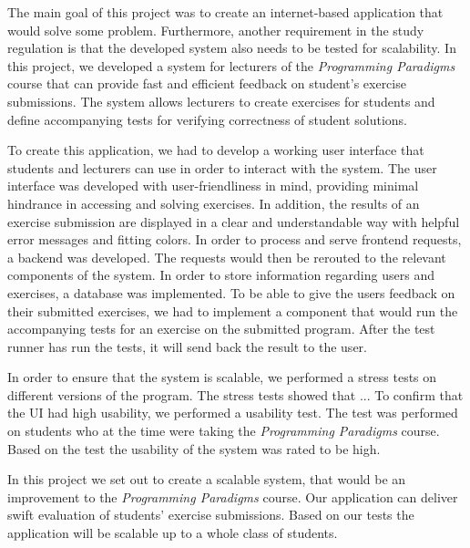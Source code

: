 The main goal of this project was to create an internet-based application that would solve some problem.
Furthermore, another requirement in the study regulation is that the developed system also needs to be tested for scalability. 
In this project, we developed a system for lecturers of the \textit{Programming Paradigms} course that can provide fast and efficient feedback on student's exercise submissions.
The system allows lecturers to create exercises for students and define accompanying tests for verifying correctness of student solutions.

To create this application, we had to develop a working user interface that students and lecturers can use in order to interact with the system. 
The user interface was developed with user-friendliness in mind, providing minimal hindrance in accessing and solving exercises. 
In addition, the results of an exercise submission are displayed in a clear and understandable way with helpful error messages and fitting colors.
In order to process and serve frontend requests, a backend was developed.
The requests would then be rerouted to the relevant components of the system. 
In order to store information regarding users and exercises, a database was implemented.
To be able to give the users feedback on their submitted exercises, we had to implement a component that would run the accompanying tests for an exercise on the submitted program. 
After the test runner has run the tests, it will send back the result to the user.

In order to ensure that the system is scalable, we performed a stress tests on different versions of the program.
The stress tests showed that ... 
To confirm that the UI had high usability, we performed a usability test.
The test was performed on students who at the time were taking the \textit{Programming Paradigms} course.
Based on the test the usability of the system was rated to be high.  

In this project we set out to create a scalable system, that would be an improvement to the \textit{Programming Paradigms} course.
Our application can deliver swift evaluation of students' exercise submissions. Based on our tests the application will be scalable up to a whole class of students.

